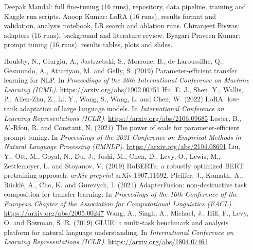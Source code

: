 \documentclass{nle}
\begin{document}
Deepak Mandal: full fine-tuning (16 runs), repository, data pipeline, training and Kaggle run scripts. Anoop Kumar: LoRA (16 runs), results format and validation, analysis notebook, LR search and ablation runs. Chiranjeet Biswas: adapters (16 runs), background and literature review. Byagari Praveen Kumar: prompt tuning (16 runs), results tables, plots and slides.

\begin{thebibliography}{}
   Houlsby, N., Giurgiu, A., Jastrzebski, S., Morrone, B., de Laroussilhe, Q.,
   Gesmundo, A., Attariyan, M. and Gelly, S. (2019) Parameter-efficient transfer
   learning for NLP. In {\it Proceedings of the 36th International Conference on
   Machine Learning (ICML)}. \url{https://arxiv.org/abs/1902.00751}
   Hu, E. J., Shen, Y., Wallis, P., Allen-Zhu, Z., Li, Y., Wang, S., Wang, L.
   and Chen, W. (2022) LoRA: low-rank adaptation of large language models. In
   {\it International Conference on Learning Representations (ICLR)}.
   \url{https://arxiv.org/abs/2106.09685}
   Lester, B., Al-Rfou, R. and Constant, N. (2021) The power of scale for
   parameter-efficient prompt tuning. In {\it Proceedings of the 2021 Conference
   on Empirical Methods in Natural Language Processing (EMNLP)}.
   \url{https://arxiv.org/abs/2104.08691}
   Liu, Y., Ott, M., Goyal, N., Du, J., Joshi, M., Chen, D., Levy, O., Lewis, M.,
   Zettlemoyer, L. and Stoyanov, V. (2019) RoBERTa: a robustly optimized BERT
   pretraining approach. {\it arXiv preprint} arXiv:1907.11692.
   Pfeiffer, J., Kamath, A., R\"uckl\'e, A., Cho, K. and Gurevych, I. (2021)
   AdapterFusion: non-destructive task composition for transfer learning. In
   {\it Proceedings of the 16th Conference of the European Chapter of the
   Association for Computational Linguistics (EACL)}.
   \url{https://arxiv.org/abs/2005.00247}
   Wang, A., Singh, A., Michael, J., Hill, F., Levy, O. and Bowman, S. R. (2019)
   GLUE: a multi-task benchmark and analysis platform for natural language
   understanding. In {\it International Conference on Learning Representations
   (ICLR)}. \url{https://arxiv.org/abs/1804.07461}
\end{thebibliography}

\label{lastpage}
\end{document}
